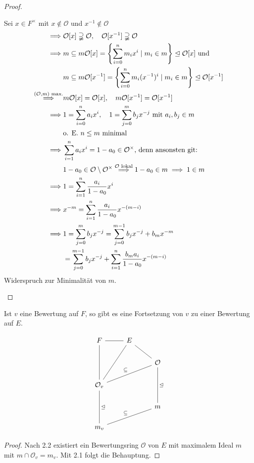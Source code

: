 \begin{proof}
\begin{itemize}
        Sei $x \in F^\times$ mit $x \notin \mathcal{O}$ und $x^{-1} \notin \mathcal{O}$
        \begin{align*}
            \implies & \mathcal{O}[x] \supsetneqq \mathcal{O},\quad \mathcal{O}[x^{-1}] \supsetneqq \mathcal{O}\\
            \implies & m \subseteq m \mathcal{O}[x] = \left\{\sum_{i = 0}^n m_i x^i \mid m_i \in m\right\} \trianglelefteq \mathcal{O}[x] \text{ und}\\
            & m \subseteq m \mathcal{O}[x^{-1}] = \left\{\sum_{i = 0}^n m_i (x^{-1})^i \mid m_i \in m\right\} \trianglelefteq \mathcal{O}[x^{-1}]\\
            \stackrel{(\mathcal{O},m) \text{ max.}}{\implies}& m\mathcal{O}[x] = \mathcal{O}[x], \quad m\mathcal{O}[x^{-1}]= \mathcal{O}[x^{-1}]\\
            \implies & 1 = \sum\limits_{i=0}^n a_ix^i, \quad 1 = \sum\limits_{j=0}^m b_jx^{-j} \text{ mit } a_i,b_j \in m\\
            &\text{o. E. } n\leq m \text{ minimal}\\
            \implies & \sum\limits_{i=1}^n a_ix^i = 1 - a_0 \in \mathcal{O}^\times \text{, denn ansonsten git:}\\
            & 1 - a_0 \in \mathcal{O} \setminus\mathcal{O}^\times \stackrel{\mathcal{O}\text{ lokal}}{\implies} 1 - a_0 \in m \implies 1 \in m\\
            \implies & 1 = \sum\limits_{i=1}^n \frac{a_i}{1 - a_0} x^i\\
            \implies & x^{-m} = \sum\limits_{i=1}^n \frac{a_i}{1-a_0} x ^{-(m-i)}\\
            \implies & 1 = \sum\limits_{j=0}^m b_jx^{-j} = \sum\limits_{j=0}^{m-1} b_jx^{-j} + b_mx^{-m} \\
            & = \sum\limits_{j=0}^{m-1} b_j x^{-j} + \sum\limits_{i=1}^n \frac{b_ma_i}{1-a_0}x^{-(m-i)}
        \end{align*}
        Widerspruch zur Minimalität von $m$.
    \end{itemize}
\end{proof}

\begin{korollar}
    Ist $v$ eine Bewertung auf $F$, so gibt es eine Fortsetzung von $v$ zu einer Bewertung auf $E$.

    $$\begin{tikzcd}
        F \rar[dash] \arrow[dd, dash]& E \arrow[ddl, dash] \drar[dash] &\\
        & & \O \arrow[dd, dash,  "\ideal"]\\
        \O_v \arrow[urr, dash, "\subseteq"] \arrow[dd, dash, "\ideal"]& &\\
        && m\\
        m_v \arrow[urr, dash, "\subseteq"]&&
    \end{tikzcd}$$
\end{korollar}
\begin{proof}
    Nach 2.2 existiert ein Bewertungsring $\mathcal{O}$ von $E$ mit maximalem Ideal $m$ mit
    $m \cap \mathcal{O}_v = m_v$. Mit 2.1 folgt die Behauptung.
\end{proof}

